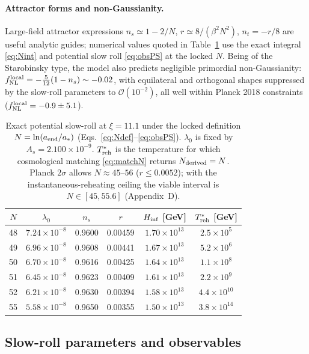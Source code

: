 \documentclass[pdflatex,sn-mathphys-num]{sn-jnl}
\theoremstyle{thmstyleone}
\begin{document}
\paragraph{Attractor forms and non-Gaussianity.} Large-field attractor expressions $n_s\simeq1-2/N$, $r\simeq8/(\beta^2N^2)$, $n_t=-r/8$ are useful analytic guides; numerical values quoted in Table~\ref{tab:sens} use the exact integral \eqref{eq:Nint} and potential slow roll \eqref{eq:obsPS} at the locked $N$. Being of the Starobinsky type, the model also predicts negligible primordial non-Gaussianity: $f_{\rm NL}^{\rm local}=-\frac{5}{12}(1-n_s)\sim-0.02$, with equilateral and orthogonal shapes suppressed by the slow-roll parameters to $\mathcal{O}(10^{-2})$, all well within Planck 2018 constraints~\cite{Planck2018} ($f_{\rm NL}^{\rm local}=-0.9\pm5.1$).

\begin{table}[t]
\centering
\caption{Exact potential slow-roll at $\xi=11.1$ under the locked definition $N=\ln(a_{\rm end}/a_*)$ (Eqs.~\eqref{eq:Ndef}--\eqref{eq:obsPS}). $\lambda_0$ is fixed by $A_s=2.100\times10^{-9}$. $T_{\rm reh}^*$ is the temperature for which cosmological matching \eqref{eq:matchN} returns $N_{\rm derived}=N$. Planck $2\sigma$ allows $N\approx45$--$56$ ($r\leq0.0052$); with the instantaneous-reheating ceiling the viable interval is $N\in[45,55.6]$ (Appendix~D).}
\label{tab:sens}
\begin{tabular}{c|c|c|c|c|c}
$N$ & $\lambda_0$ & $n_s$ & $r$ & $H_{\rm inf}$ [GeV] & $T_{\rm reh}^*$ [GeV] \\
\hline
48 & $7.24\times10^{-8}$ & 0.9600 & 0.00459 & $1.70\times10^{13}$ & $2.5\times10^{5}$ \\
49 & $6.96\times10^{-8}$ & 0.9608 & 0.00441 & $1.67\times10^{13}$ & $5.2\times10^{6}$ \\
50 & $6.70\times10^{-8}$ & 0.9616 & 0.00425 & $1.64\times10^{13}$ & $1.1\times10^{8}$ \\
51 & $6.45\times10^{-8}$ & 0.9623 & 0.00409 & $1.61\times10^{13}$ & $2.2\times10^{9}$ \\
52 & $6.21\times10^{-8}$ & 0.9630 & 0.00394 & $1.58\times10^{13}$ & $4.4\times10^{10}$ \\
55 & $5.58\times10^{-8}$ & 0.9650 & 0.00355 & $1.50\times10^{13}$ & $3.8\times10^{14}$ \\
\end{tabular}
\end{table}

\subsection{Slow-roll parameters and observables}
\end{document}
